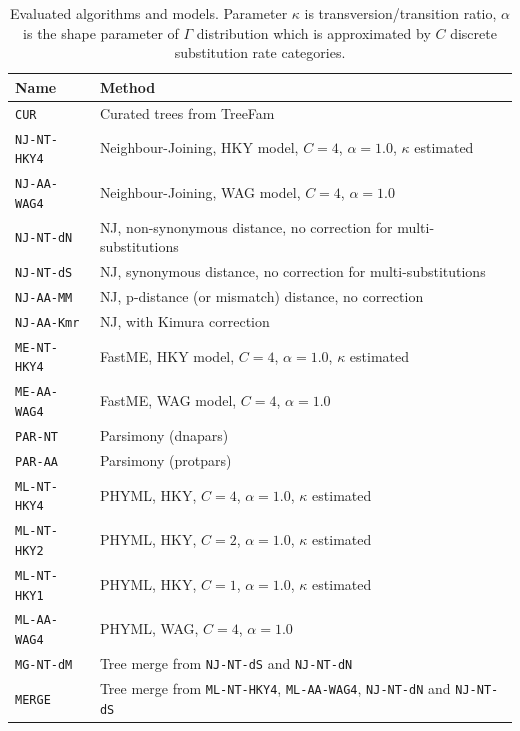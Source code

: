 \begin{table}
\begin{center}
\begin{tabular}{|l|l|}
\hline
Name & Method \\
\hline
{\tt CUR} & Curated trees from TreeFam \\
\hline
{\tt NJ-NT-HKY4} & Neighbour-Joining, HKY model, $C=4$, $\alpha=1.0$, $\kappa$ estimated \\
{\tt NJ-AA-WAG4} & Neighbour-Joining, WAG model, $C=4$, $\alpha=1.0$ \\
{\tt NJ-NT-dN} & NJ, non-synonymous distance, no correction for multi-substitutions \\
{\tt NJ-NT-dS} & NJ, synonymous distance, no correction for multi-substitutions \\
{\tt NJ-AA-MM} & NJ, p-distance (or mismatch) distance, no correction \\
{\tt NJ-AA-Kmr} & NJ, with Kimura correction \\
{\tt ME-NT-HKY4} & FastME, HKY model, $C=4$, $\alpha=1.0$, $\kappa$ estimated \\
{\tt ME-AA-WAG4} & FastME, WAG model, $C=4$, $\alpha=1.0$ \\
\hline
{\tt PAR-NT} & Parsimony (dnapars) \\
{\tt PAR-AA} & Parsimony (protpars) \\
\hline
{\tt ML-NT-HKY4} & PHYML, HKY, $C=4$, $\alpha=1.0$, $\kappa$ estimated \\
{\tt ML-NT-HKY2} & PHYML, HKY, $C=2$, $\alpha=1.0$, $\kappa$ estimated \\
{\tt ML-NT-HKY1} & PHYML, HKY, $C=1$, $\alpha=1.0$, $\kappa$ estimated \\
{\tt ML-AA-WAG4} & PHYML, WAG, $C=4$, $\alpha=1.0$ \\
\hline
{\tt MG-NT-dM} & Tree merge from {\tt NJ-NT-dS} and {\tt NJ-NT-dN} \\
{\tt MERGE} & Tree merge from {\tt ML-NT-HKY4}, {\tt ML-AA-WAG4}, {\tt NJ-NT-dN} and {\tt NJ-NT-dS}\\
\hline
\end{tabular}
\caption[Evaluated algorithms and models]{Evaluated algorithms and models. Parameter $\kappa$
	is transversion/transition ratio, $\alpha$ is the shape parameter of $\Gamma$ distribution
	which is approximated by $C$ discrete substitution rate categories.}\label{tab:eval-algo}
\end{center}
\end{table}

